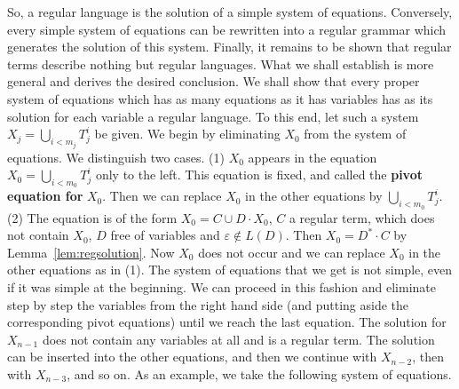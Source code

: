 So, a regular language is the solution of a simple system of
equations. Conversely, every simple system of equations can be
rewritten into a regular grammar which generates the solution
of this system. Finally, it remains to be shown that regular terms
describe nothing but regular languages. What we shall establish is
more general and derives the desired conclusion. We shall show
that every proper system of equations which has as many
equations as it has variables has as its solution for each
variable a regular language. To this end, let such a system
$X_j = \bigcup_{i < m_j} T_j^i$ be given. We begin by eliminating
$X_0$ from the system of equations. We distinguish two cases.
(1) $X_0$ appears in the equation $X_0 = \bigcup_{i < m_0}
T^i_j$ only to the left. This equation is fixed, and called the
\textbf{pivot equation for} $X_0$. Then we can replace $X_0$
in the other equations by $\bigcup_{i < m_0} T^i_j$. 
(2) The equation is of the form $X_0 = C \cup D \cdot X_0$, 
$C$ a regular term, which does not contain $X_0$, $D$
free of variables and $\varepsilon \not\in L(D)$. Then
$X_0 = D^{\ast} \cdot C$ by Lemma~\ref{lem:regsolution}.
Now $X_0$ does not occur and we can replace $X_0$ in the other
equations as in (1). The system of equations
that we get is not simple, even if it was simple at the beginning.
We can proceed in this fashion and eliminate step by step the
variables from the right hand side (and putting aside the
corresponding pivot equations) until we reach the last equation.
The solution for $X_{n -1}$ does not contain any variables at all
and is a regular term. The solution can be inserted into the
other equations, and then we continue with $X_{n-2}$, then
with $X_{n-3}$, and so on.
As an example, we take the following system of equations.
